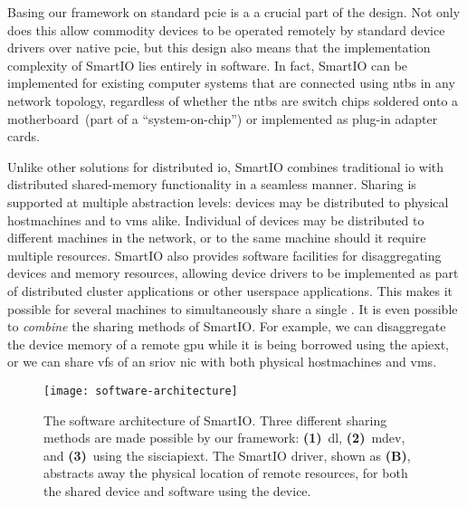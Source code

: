 Basing our framework on standard \gls{pcie} is a a crucial part of the design.
%
Not only does this allow commodity devices to be operated remotely by standard device drivers over native \gls{pcie}, but this design also means that the implementation complexity of SmartIO lies entirely in software.
%
In fact, SmartIO can be implemented for existing computer systems that are connected using \glspl{ntb} in any network topology, regardless of whether the \glspl{ntb} are switch chips soldered onto a motherboard~(part of a ``system-on-chip'') or implemented as plug-in adapter cards.



Unlike other solutions for distributed \gls{io}, SmartIO combines traditional \gls{io} with distributed shared-memory functionality in a seamless manner.
%
Sharing is supported at multiple abstraction levels:
%
devices may be distributed to physical \glspl{hostmachine} and to \glspl{vm} alike.
%
Individual  of  devices may be distributed to different machines in the network, or to the same machine should it require multiple resources.
%
SmartIO also provides software facilities for \gls{disaggregating} devices and memory resources, allowing device drivers to be implemented as part of distributed cluster applications or other \gls{userspace} applications. 
%
This makes it possible for several machines to simultaneously share a single .
%
It is even possible to \emph{combine} the sharing methods of SmartIO. 
%
For example, we can \gls{disaggregate} the device memory of a remote \gls{gpu} while it is being borrowed using the \gls{apiext}, or we can share \glspl{vf} of an \gls{sriov} \gls{nic} with both physical \glspl{hostmachine} and \glspl{vm}.


\begin{figure}
    \centering
    \texttt{[image: software-architecture]}
    \caption[Three different sharing methods are made possible by our framework. The SmartIO driver abstracts away the physical location of a remote resource]
    {The software architecture of SmartIO. Three different sharing methods are made possible by our framework: \textbf{(1)}~\gls{dl}, \textbf{(2)}~\gls{mdev}, and \textbf{(3)}~using the \gls{sisciapiext}. The SmartIO driver, shown as \textbf{(B)}, abstracts away the physical location of remote resources, for both the shared device and software using the device.}
    \label{fig:architecture}
\end{figure}


